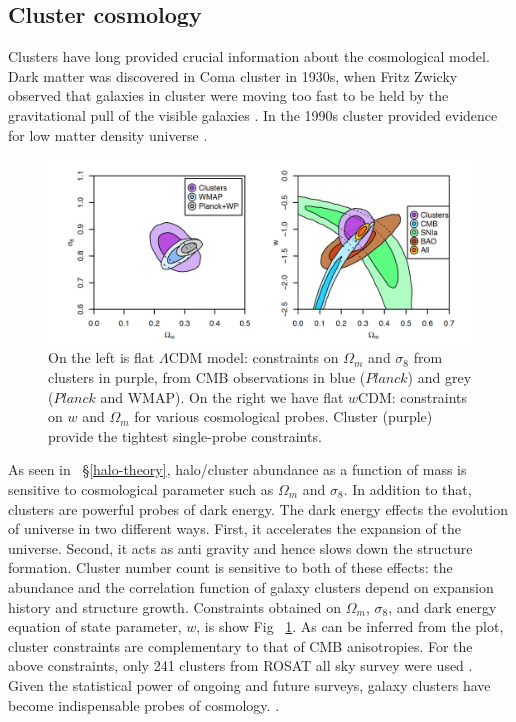 \subsection{Cluster cosmology}
Clusters have long provided crucial information about the cosmological model. Dark matter was discovered in Coma cluster in 1930s, when Fritz Zwicky observed that galaxies in cluster were moving too fast to be held by the gravitational pull of the visible galaxies \citep{zwicky33}. In the 1990s cluster provided evidence for low matter density universe \citep{white93a}. %
\begin{figure}[ht]
\includegraphics[width = \columnwidth]{figs/cosmology.png}
\caption{On the left is flat $\Lambda$CDM model: constraints on $\Omega_{m}$ and $\sigma_{8}$ from clusters in purple, from CMB observations in blue ($Planck$) and grey ($Planck$ and WMAP). On the right we have flat $w$CDM: constraints on $w$ and $\Omega_{m}$ for various cosmological probes. Cluster (purple) provide the tightest single-probe constraints.  }
\label{clustercosmology}
\end{figure}

As seen in ~\S\ref{halo-theory}, halo/cluster abundance as a function of mass is sensitive to cosmological parameter such as $\Omega_{m}$ and $\sigma_{8}$. In addition to that, clusters are powerful probes of dark energy. The dark energy effects the evolution of universe in two different ways. 
First, it accelerates the expansion of the universe. Second, it acts as anti gravity and hence slows down the structure formation. Cluster number count is sensitive to both of these effects: the abundance and the correlation function of galaxy clusters depend on expansion history and structure growth. 
Constraints obtained on $\Omega_{m}$, $\sigma_{8}$, and dark energy equation of state parameter, $w$, is show Fig ~\ref{clustercosmology}.
As can be inferred from the plot, cluster constraints are complementary to that of CMB anisotropies. For the above constraints, only 241 clusters from ROSAT all sky survey were used \cite{mantz15}. Given the statistical power of ongoing and future surveys, galaxy clusters have become indispensable probes of cosmology. \cite{so18,benson14}. %

